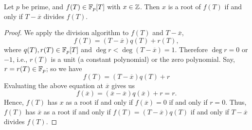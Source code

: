 \vspace*{1.5em}

\begin{lemma}\label{factthm}
Let $p$ be prime, and $f(T) \in \mathbb F_p[T]$ with $x \in \mathbb Z$. Then $x$ is a root of $f(T)$ if and only if $T - \overline{x}$ divides $f(T)$.
\end{lemma}
\begin{proof}
We apply the division algorithm to $f(T)$ and $T - \overline{x}$,
\[f(T) = (T-\overline{x})q(T) + r(T),\]
where $q(T),r(T) \in \mathbb F_p[T]$ and $\deg r < \deg (T - \overline{x}) = 1$. Therefore $\deg r = 0$ or $-1$, i.e., $r(T)$ is a unit (a constant polynomial) or the zero polynomial. Say, $r = r(T) \in \mathbb F_p$; so we have
\[f(T) = (T-\overline{x})q(T) + r\]
Evaluating the above equation at $\overline{x}$ gives us 
\[f(\overline{x}) = (\overline{x}-\overline{x})q(\overline{x}) + r = r.\]
Hence, $f(T)$ has $x$ as a root if and only if $f(\overline{x}) = 0$ if and only if $r = 0$. Thus, $f(T)$ has $\overline{x}$ as a root if and only if $f(T) = (T-\overline{x})q(T)$ if and only if $T - \overline{x}$ divides $f(T)$.
\end{proof}

\vspace*{1.5em}

